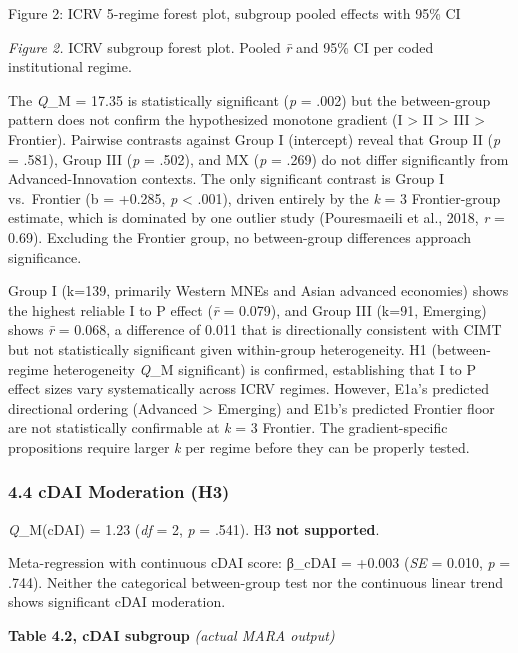\documentclass[
  12pt,a4paper]{article}
\begin{document}
Figure 2: ICRV 5-regime forest plot, subgroup pooled effects with 95\%
CI

\emph{Figure 2.} ICRV subgroup forest plot. Pooled \emph{r̄} and 95\% CI
per coded institutional regime.

The \emph{Q}\_M = 17.35 is statistically significant (\emph{p} = .002)
but the between-group pattern does not confirm the hypothesized monotone
gradient (I \textgreater{} II \textgreater{} III \textgreater{}
Frontier). Pairwise contrasts against Group I (intercept) reveal that
Group II (\emph{p} = .581), Group III (\emph{p} = .502), and MX
(\emph{p} = .269) do not differ significantly from Advanced-Innovation
contexts. The only significant contrast is Group I vs.~Frontier (b =
+0.285, \emph{p} \textless{} .001), driven entirely by the \emph{k} = 3
Frontier-group estimate, which is dominated by one outlier study
(Pouresmaeili et al., 2018, \emph{r} = 0.69). Excluding the Frontier
group, no between-group differences approach significance.

Group I (k=139, primarily Western MNEs and Asian advanced economies)
shows the highest reliable I to P effect (\emph{r̄} = 0.079), and Group
III (k=91, Emerging) shows \emph{r̄} = 0.068, a difference of 0.011 that
is directionally consistent with CIMT but not statistically significant
given within-group heterogeneity. H1 (between-regime heterogeneity
\emph{Q}\_M significant) is confirmed, establishing that I to P effect
sizes vary systematically across ICRV regimes. However, E1a's predicted
directional ordering (Advanced \textgreater{} Emerging) and E1b's
predicted Frontier floor are not statistically confirmable at \emph{k} =
3 Frontier. The gradient-specific propositions require larger \emph{k}
per regime before they can be properly tested.

\hypertarget{cdai-moderation-h3}{%
\subsubsection{4.4 cDAI Moderation (H3)}\label{cdai-moderation-h3}}

\emph{Q}\_M(cDAI) = 1.23 (\emph{df} = 2, \emph{p} = .541). H3
\textbf{not supported}.

Meta-regression with continuous cDAI score: β\_cDAI = +0.003 (\emph{SE}
= 0.010, \emph{p} = .744). Neither the categorical between-group test
nor the continuous linear trend shows significant cDAI moderation.

\textbf{Table 4.2, cDAI subgroup} \emph{(actual MARA output)}
\end{document}
